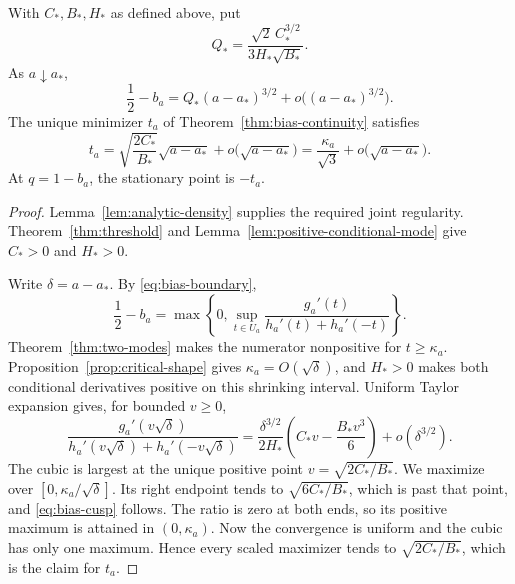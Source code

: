 \begin{proposition}\label{prop:bias-cusp}
With $C_*,B_*,H_*$ as defined above, put
\[
 Q_* = \frac{\sqrt{2}\,C_*^{3/2}}{3H_*\sqrt{B_*}}.
\]
As $a\downarrow a_*$,
\begin{equation}\label{eq:bias-cusp}
 \frac12-b_a=Q_*(a-a_*)^{3/2}+o\bigl((a-a_*)^{3/2}\bigr).
\end{equation}
The unique minimizer $t_a$ of
Theorem~\ref{thm:bias-continuity} satisfies
\[
 t_a=\sqrt{\frac{2C_*}{B_*}}\sqrt{a-a_*}
       +o\bigl(\sqrt{a-a_*}\bigr)
     =\frac{\kappa_a}{\sqrt3}+o\bigl(\sqrt{a-a_*}\bigr).
\]
At $q=1-b_a$, the stationary point is $-t_a$.
\end{proposition}

\begin{proof}
Lemma~\ref{lem:analytic-density} supplies the required joint regularity.
Theorem~\ref{thm:threshold} and
Lemma~\ref{lem:positive-conditional-mode} give $C_*>0$ and $H_*>0$.

Write $\delta=a-a_*$. By \eqref{eq:bias-boundary},
\[
 \frac12-b_a=\max\left\{0,\sup_{t\in U_a}
     \frac{g_a'(t)}{h_a'(t)+h_a'(-t)}\right\}.
\]
Theorem~\ref{thm:two-modes} makes the numerator nonpositive for $t\ge \kappa_a$.
Proposition~\ref{prop:critical-shape} gives
$\kappa_a=O(\sqrt\delta)$, and $H_*>0$ makes both conditional derivatives
positive on this shrinking interval. Uniform Taylor expansion gives,
for bounded $v\ge0$,
\[
 \frac{g_a'(v\sqrt\delta)}{h_a'(v\sqrt\delta)+h_a'(-v\sqrt\delta)}
 =\frac{\delta^{3/2}}{2H_*}
       \left(C_*v-\frac{B_*v^3}{6}\right)+o(\delta^{3/2}).
\]
The cubic is largest at the unique positive point
$v=\sqrt{2C_*/B_*}$. We maximize over $[0,\kappa_a/\sqrt\delta]$.
Its right endpoint tends to $\sqrt{6C_*/B_*}$, which is past that
point, and \eqref{eq:bias-cusp} follows. The ratio is zero at both
ends, so its positive maximum is attained in $(0,\kappa_a)$. Now the
convergence is uniform and the cubic has only one maximum. Hence
every scaled maximizer tends to $\sqrt{2C_*/B_*}$, which is the claim
for $t_a$.
\end{proof}
